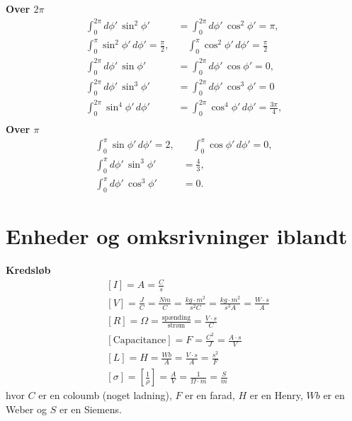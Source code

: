 \documentclass[a4paper]{article}
\begin{document}
    \textbf{Over \(2 \pi \) } 
    \begin{align*}
        \int_0^{2\pi} d\phi' \,\sin^2 \phi'
        &= \int_0^{2\pi} d\phi' \,\cos^2 \phi'
        = \pi, \\[6pt]
        \int_0^{\pi} \sin^2 \phi' \, d\phi'
        = \frac{\pi}{2}, 
        &\quad
        \int_0^{\pi} \cos^2 \phi' \, d\phi'
        = \frac{\pi}{2}\\
        \int_0^{2\pi} d\phi' \,\sin \phi'
        &= \int_0^{2\pi} d\phi' \,\cos \phi'
        = 0, \\[6pt]
        \int_0^{2\pi} d\phi' \,\sin^3 \phi'
        &= \int_0^{2\pi} d\phi' \,\cos^3 \phi'
        = 0\\
        \int_0^{2\pi} \sin^4 \phi' \, d\phi'
        &= \int_0^{2\pi} \cos^4 \phi' \, d\phi'
        = \frac{3\pi}{4}, \\[6pt]
    \end{align*}
    \textbf{Over \(\pi \)} 
    \begin{align*}
        \int_0^{\pi} \sin \phi' \, d\phi'
        = 2, 
        &\quad
        \int_0^{\pi} \cos \phi' \, d\phi'
        = 0, \\[6pt]
        \int_0^{\pi} d\phi' \,\sin^3 \phi'
        &= \frac{4}{3}, \\[6pt]
        \int_0^{\pi} d\phi' \,\cos^3 \phi'
        &= 0.
    \end{align*}
    \newpage
    \section{Enheder og omksrivninger iblandt}
    \textbf{Kredsløb} 
    \begin{align*}
        &\left[ I \right] = A = \frac{C}{s}\\
        &\left[ V \right] = \frac{J}{C} = \frac{Nm}{C} = \frac{kg \cdot m^{2} }{s ^{2} C} = \frac{kg \cdot m^{2} }{s^3 A} = \frac{W \cdot s}{A}\\
        &\left[ R \right] = \Omega = \frac{\text{spænding}}{\text{strøm}} = \frac{V \cdot s}{C}\\
        &\left[ \text{Capacitance} \right] = F = \frac{C^{2}}{J} = \frac{A \cdot s}{V}\\
        &\left[ L \right] = H = \frac{Wb}{A} = \frac{V \cdot s}{A} = \frac{s^2}{F}\\
        &\left[ \sigma  \right] = \left[ \frac{1}{\rho } \right] = \frac{A}{V} = \frac{1}{\Omega \cdot m} = \frac{S}{m} 
    \end{align*}
    hvor \(C\) er en coloumb (noget ladning), \(F\) er en farad, \(H\) er en Henry, \(Wb\) er en Weber og \(S\) er en Siemens.
\end{document}
